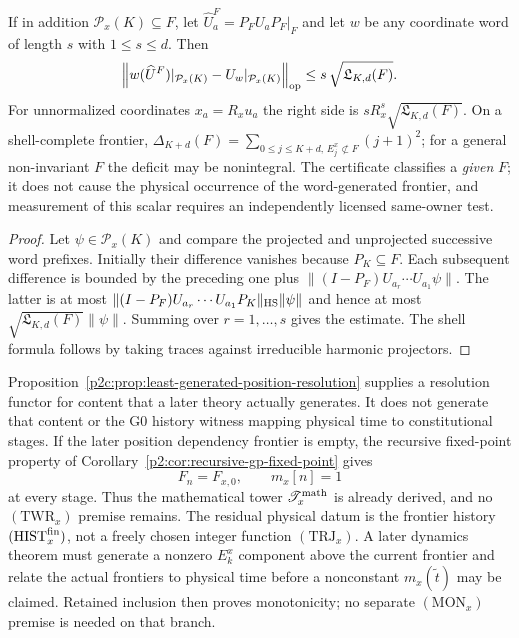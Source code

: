 \documentclass[12pt,a4paper]{article}
\begin{document}
\begin{corollary}
\label{p2c:cor:v269-compressed-word-stability}
If in addition $\mathcal P_x(K)\subseteq F$, let
$\widehat U_a^F=P_FU_aP_F|_F$ and let $w$ be any coordinate word of
length $s$ with $1\le s\le d$. Then
\[
 \left\|w(\widehat U^F)|_{\mathcal P_x(K)}
       -U_w|_{\mathcal P_x(K)}\right\|_{\rm op}
 \le s\,\sqrt{\mathfrak L_{K,d}(F)}.
\]
For unnormalized coordinates $x_a=R_x u_a$ the right side is
$sR_x^s\sqrt{\mathfrak L_{K,d}(F)}$. On a shell-complete frontier,
$\Delta_{K+d}(F)=\sum_{0\le j\le K+d,\,E_j^x\not\subset F}(j+1)^2$;
for a general non-invariant $F$ the deficit may be nonintegral.
The certificate classifies a \emph{given} $F$; it does not cause the
physical occurrence of the word-generated frontier, and measurement
of this scalar requires an independently licensed same-owner test.
\end{corollary}
\begin{proof}
Let $\psi\in\mathcal P_x(K)$ and compare the projected and
unprojected successive word prefixes. Initially their difference
vanishes because $P_K\subseteq F$. Each subsequent difference is
bounded by the preceding one plus
$\|(I-P_F)U_{a_r}\cdots U_{a_1}\psi\|$.
The latter is at most
$\|(I-P_F)U_{a_r}\cdots U_{a_1}P_K\|_{\rm HS}\|\psi\|$
and hence at most $\sqrt{\mathfrak L_{K,d}(F)}\|\psi\|$.
Summing over $r=1,\ldots,s$ gives the estimate. The shell formula
follows by taking traces against irreducible harmonic projectors.
\end{proof}

\begin{remark}
\label{p2c:rem:position-unfolding-stopping-point}
Proposition~\ref{p2c:prop:least-generated-position-resolution} supplies a
resolution functor for content that a later theory actually generates.  It
does not generate that content or the G0 history witness mapping physical time
to constitutional stages.  If the later position dependency frontier is empty, the recursive
fixed-point property of
Corollary~\ref{p2:cor:recursive-gp-fixed-point} gives
\[
        F_n=F_{x,0},
        \qquad
        m_x[n]=1
\]
at every stage.  Thus the mathematical tower
\(\mathscr T_x^{\rm math}\) is already derived, and no
\((\mathrm{TWR}_x)\) premise remains.  The residual physical datum is the
frontier history \((\mathrm{HIST}_x^{\rm fin})\), not a freely chosen integer
function \((\mathrm{TRJ}_x)\).  A later dynamics theorem must generate a
nonzero \(E_k^x\) component above the current frontier and relate the actual
frontiers to physical time before a nonconstant \(m_x(\widetilde t)\) may be
claimed.  Retained inclusion then proves monotonicity; no separate
\((\mathrm{MON}_x)\) premise is needed on that branch.
\end{remark}
\end{document}
